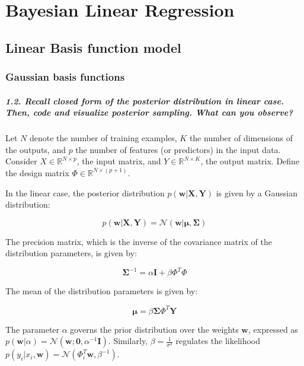 \graphicspath{{figs/3a}}
\chapter{Bayesian Linear Regression}




\section{Linear Basis function model}
\subsection{Gaussian basis functions}
\paragraph*{1.2. Recall closed form of the posterior distribution in linear case. Then, code and visualize posterior sampling. What can you observe?}

Let $N$ denote the number of training examples, $K$ the number of dimensions of the outputs, and $p$ the number of features (or predictors) in the input data. Consider $X \in \mathbb{R}^{N \times p}$, the input matrix, and $Y \in \mathbb{R}^{N \times K}$, the output matrix. Define the design matrix $\Phi \in \mathbb{R}^{N \times (p + 1)}$. 

In the linear case, the posterior distribution $p(\mathbf{w}|\mathbf{X}, \mathbf{Y})$ is given by a Gaussian distribution:

\[
    p(\mathbf{w}|\mathbf{X}, \mathbf{Y}) = \mathcal{N}(\mathbf{w}|\boldsymbol{\mu}, \boldsymbol{\Sigma})
\]

The precision matrix, which is the inverse of the covariance matrix of the distribution parameters, is given by:

\[
    \boldsymbol{\Sigma}^{-1} = \alpha \mathbf{I} + \beta \Phi^T \Phi
\]

The mean of the distribution parameters is given by:

\[
    \boldsymbol{\mu} = \beta \boldsymbol{\Sigma} \Phi^T \mathbf{Y}
\]

The parameter $\alpha$ governs the prior distribution over the weights $\mathbf{w}$, expressed as $p(\mathbf{w} | \alpha) = \mathcal{N}(\mathbf{w}; \mathbf{0}, \alpha^{-1}\mathbf{I})$. Similarly, $\beta = \frac{1}{\sigma^2}$ regulates the likelihood $p(y_i | x_i, \mathbf{w}) = \mathcal{N}(\Phi_i^T \mathbf{w}, \beta^{-1})$.


